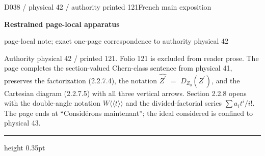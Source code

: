 \documentclass[9pt]{article}
\newcommand{\CanonText}[1]{\par{\fontsize{8.0}{9.35}\selectfont\RaggedRight #1\par}\vspace{2.2pt}}
\newcommand{\LayerTitle}{Restrained page-local apparatus}
\begin{document}
\noindent\begin{minipage}[t][\dimexpr\textheight-5pt\relax][t]{\textwidth}
{\sffamily\fontsize{7.3}{8.2}\selectfont\color{Quiet} D038 / physical 42 / authority printed 121\hfill French main exposition}
\par{}\vspace{4.5pt}
{\sffamily\fontsize{10.4}{11.6}\selectfont\bfseries\color{Accent} \LayerTitle}
\par{\sffamily\fontsize{6.7}{7.7}\selectfont\color{Quiet} page-local note; exact one-page correspondence to authority physical 42}
\vspace{5pt}
\CanonText{Authority physical 42 / printed 121. Folio 121 is excluded from reader prose. The page completes the section-valued Chern-class sentence from physical 41, preserves the factorization (2.2.7.4), the notation \(\widehat{Z^{\prime}}\) \(=\) \(D_{Z_{0}}(Z^{\prime})\), and the Cartesian diagram (2.2.7.5) with all three vertical arrows. Section 2.2.8 opens with the double-angle notation \(W\langle{}\langle{}t\rangle{}\rangle{}\) and the divided-factorial series \(\sum{}a_{i}t^{i}/i\)!. The page ends at “Considérons maintenant”; the ideal considered is confined to physical 43.}
\vfill
{\color{Accent}\hrule height 0.35pt}\vspace{3pt}
\end{minipage}
\newpage
\end{document}
